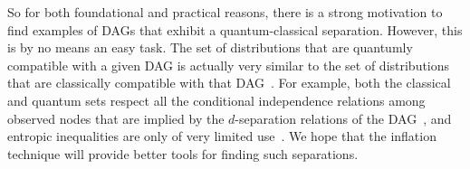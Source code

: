 {So for both foundational and practical reasons, there is a strong motivation to find examples of DAGs that exhibit a quantum-classical separation.
However, this is by no means an easy task.
The set of distributions that are quantumly compatible with a given DAG is actually very similar to the set of distributions that are classically compatible with that DAG~\cite{pusey2014gdag,fritz2012bell}. For example, both the classical and quantum sets respect all the conditional independence relations among observed nodes that are implied by the $d$-separation relations of the DAG~\cite{pusey2014gdag}, and entropic inequalities are only of very limited use~\cite{chaves2012entropic,fritz2012bell}. We hope that the inflation technique will provide better tools for finding such separations.


}
